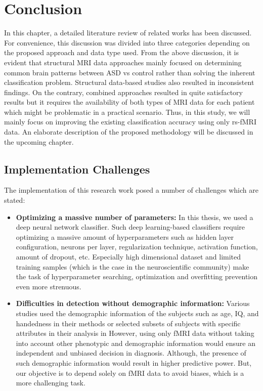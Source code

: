 \section{Conclusion}
In this chapter, a detailed literature review of related works has been discussed. For
convenience, this discussion was divided into three categories depending on the proposed
approach and data type used. From the above discussion, it is evident that structural MRI
data approaches mainly focused on determining common brain patterns between ASD vs
control rather than solving the inherent classification problem. Structural data-based studies
also resulted in inconsistent findings. On the contrary, combined approaches resulted in quite
satisfactory results but it requires the availability of both types of MRI data for each patient
which might be problematic in a practical scenario. Thus, in this study, we will mainly focus
on improving the existing classification accuracy using only rs-fMRI data. An elaborate
description of the proposed methodology will be discussed in the upcoming chapter.

\subsection{Implementation Challenges}
The implementation of this research work posed a number of challenges which are stated:\\

\begin{itemize}
    \item \textbf{Optimizing a massive number of parameters:} In this thesis, we used a deep neural
network classifier. Such deep learning-based classifiers require optimizing a massive
amount of hyperparameters such as hidden layer configuration, neurons per layer,
regularization technique, activation function, amount of dropout, etc. Especially high
dimensional dataset and limited training samples (which is the case in the
neuroscientific community) make the task of hyperparameter searching, optimization
and overfitting prevention even more strenuous.

\item \textbf{Difficulties in detection without demographic information:} Various studies used
the demographic information of the subjects such as age, IQ, and handedness in their
methods or selected subsets of subjects with specific attributes in their analysis in \cite{eslami2019asd}
However, using only fMRI data without taking into account other phenotypic and
demographic information would ensure an independent and unbiased decision in
diagnosis. Although, the presence of such demographic information would result in
higher predictive power. But, our objective is to depend solely on fMRI data to avoid
biases, which is a more challenging task.
\end{itemize}